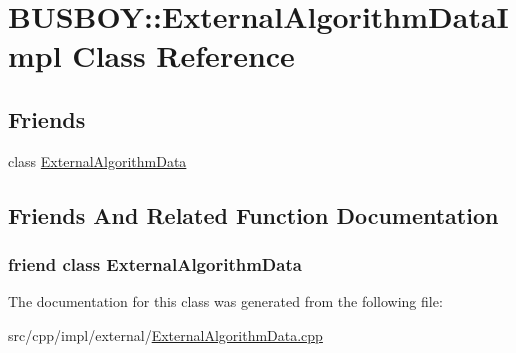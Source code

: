 \hypertarget{classBUSBOY_1_1ExternalAlgorithmDataImpl}{
\section{BUSBOY::ExternalAlgorithmDataImpl Class Reference}
\label{classBUSBOY_1_1ExternalAlgorithmDataImpl}
}
\subsection*{Friends}
\begin{DoxyCompactItemize}
\item 
class \hyperlink{classBUSBOY_1_1ExternalAlgorithmDataImpl_adec9a18bbae11986fbb7ed393c7b5562}{ExternalAlgorithmData}
\end{DoxyCompactItemize}


\subsection{Friends And Related Function Documentation}
\hypertarget{classBUSBOY_1_1ExternalAlgorithmDataImpl_adec9a18bbae11986fbb7ed393c7b5562}{
\subsubsection[{ExternalAlgorithmData}]{\setlength{\rightskip}{0pt plus 5cm}friend class {\bf ExternalAlgorithmData}}}
\label{classBUSBOY_1_1ExternalAlgorithmDataImpl_adec9a18bbae11986fbb7ed393c7b5562}


The documentation for this class was generated from the following file:\begin{DoxyCompactItemize}
\item 
src/cpp/impl/external/\hyperlink{ExternalAlgorithmData_8cpp}{ExternalAlgorithmData.cpp}\end{DoxyCompactItemize}
